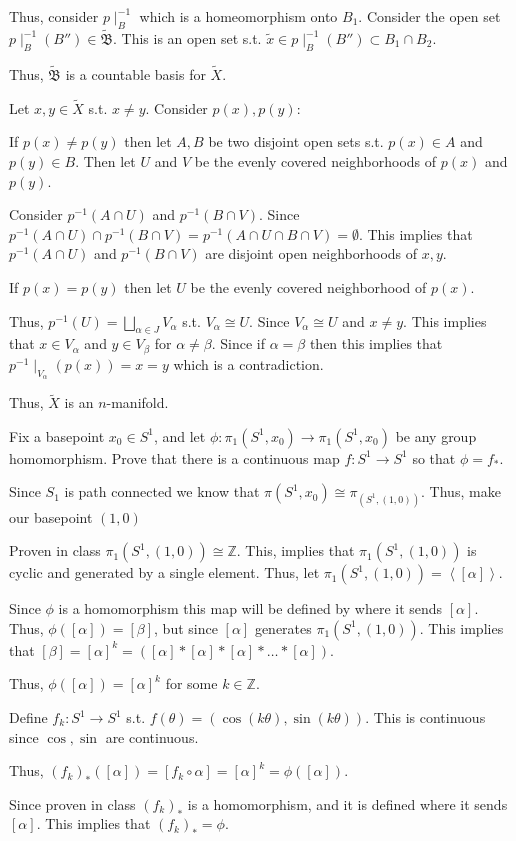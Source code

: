 \documentclass[12pt, letterpaper]{article}
\newcommand{\Z}{\mathbb{Z}}
\newcommand{\ang}[1]{\left\langle #1 \right\rangle}
\begin{document}
\begin{problemproof}
  Thus, consider $p\mid_{B}^{-1}$ which is a homeomorphism onto $B_1$. Consider the open set $p\mid_{B}^{-1}(B'') \in \widetilde{\mathfrak{B}}$. This is an open set s.t. $\widetilde{x} \in p\mid_{B}^{-1}(B'') \subset B_1 \cap B_2$.

  Thus, $\widetilde{\mathfrak{B}}$ is a countable basis for $\widetilde{X}$.

  Let $x,y \in \widetilde{X}$ s.t. $x \neq y$. Consider $p(x),p(y)$:

  If $p(x) \neq p(y)$ then let $A,B$ be two disjoint open sets s.t. $p(x) \in A$ and $p(y) \in B$. Then let $U$ and $V$ be the evenly covered neighborhoods of $p(x)$ and $p(y)$.

  Consider $p^{-1}(A \cap U)$ and $p^{-1}(B \cap V)$. Since $p^{-1}(A \cap U) \cap p^{-1}(B \cap V)=p^{-1}(A \cap U \cap B \cap V)=\emptyset$. This implies that $p^{-1}(A \cap U)$ and $p^{-1}(B \cap V)$ are disjoint open neighborhoods of $x,y$.

  If $p(x) = p(y)$ then let $U$ be the evenly covered neighborhood of $p(x)$.

  Thus, $p^{-1}(U)=\bigsqcup_{\alpha \in J}V_\alpha$ s.t. $V_\alpha \cong U$. Since $V_\alpha \cong U$ and $x \neq y$. This implies that $x \in V_\alpha$ and $y \in V_\beta$ for $\alpha \neq \beta$. Since if $\alpha = \beta$ then this implies that $p^{-1}\mid_{V_\alpha}(p(x))=x=y$ which is a contradiction.

  Thus, $\widetilde{X}$ is an $n$-manifold.
\end{problemproof}

\begin{problem}{}
  Fix a basepoint $x_0 \in S^1$, and let
  $\phi:\pi_1(S^1, x_0) \to \pi_1(S^1, x_0)$ be any group
  homomorphism. Prove that there is a continuous map $f:S^1 \to S^1$
  so that $\phi = f_*$.
\end{problem}
\begin{problemproof}
  Since $S_1$ is path connected we know that $\pi(S^1,x_0) \cong \pi_(S^1,(1,0))$. Thus, make our basepoint $(1,0)$

  Proven in class $\pi_1(S^1, (1,0)) \cong \Z$. This, implies that $\pi_1(S^1, (1,0))$ is cyclic and generated by a single element. Thus, let $\pi_1(S^1,(1,0))=\ang{[\alpha]}$.

  Since $\phi$ is a homomorphism this map will be defined by where it sends $[\alpha]$. Thus, $\phi([\alpha])=[\beta]$, but since $[\alpha]$ generates $\pi_1(S^1,(1,0))$. This implies that $[\beta]=[\alpha]^k=([\alpha] * [\alpha] * [\alpha] * \dots * [\alpha])$.

  Thus, $\phi([\alpha])=[\alpha]^k$ for some $k \in \Z$.

  Define $f_k : S^1 \to S^1$ s.t. $f(\theta)=(\cos(k\theta),\sin(k\theta))$. This is continuous since $\cos,\sin$ are continuous.

  Thus, $(f_k)_*([\alpha])=[f_k \circ \alpha]=[\alpha]^k=\phi([\alpha])$.

  Since proven in class $(f_k)_*$ is a homomorphism, and it is defined where it sends $[\alpha]$. This implies that $(f_k)_*=\phi$.
\end{problemproof}
\end{document}
